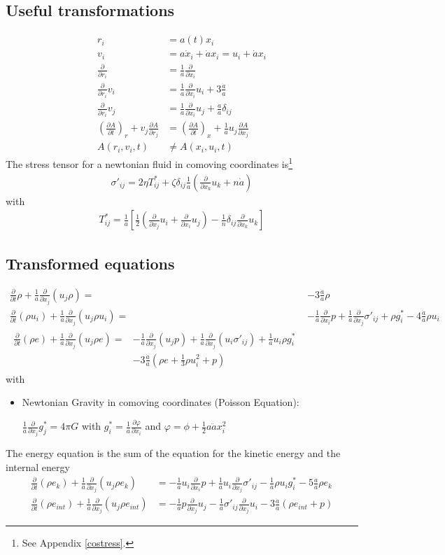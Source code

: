 \documentclass[a4paper,
					fontsize=12pt,
					twoside,
					pagesize,
					cleardoublepage=plain,
					headsepline,
					bibliography=totoc
					]{scrbook}
\newcommand{\lra}[1]{{ \left( #1 \right) }}
\newcommand{\lrb}[1]{{ \left[ #1 \right] }}
\newcommand{\pd}[1]{\frac{\partial}{\partial #1}}
\newcommand{\fa}{\frac{1}{a}}
\newcommand{\fh}{\frac{\dot{a}}{a}}
\begin{document}
\subsection{Useful transformations}
\begin{align}
r_i&=a(t) x_i\\
v_i&= a \dot{x}_i + \dot{a} x_i = u_i + \dot{a} x_i\\
\pd{r_i}&=\fa\pd{x_i}\\
\pd{r_i}v_i&=\fa\pd{x_i}u_i+3\fh\label{eq:cotrans4}\\
\pd{r_i}v_j&=\fa\pd{x_i}u_j + \fh\delta_{ij} \label{eq:cotrans5}\\
\lra{\frac{\partial A}{\partial t}}_r+v_j \frac{\partial A}{\partial r_j} &= 
\lra{\frac{\partial A}{\partial t}}_x+\fa u_j \frac{\partial A}{\partial
x_j}\\
A(r_i,v_i,t) &\neq A(x_i,u_i,t)
\end{align}
The stress tensor for a newtonian fluid in comoving coordinates is\footnote{See
Appendix \ref{costress}.}
\begin{align}
\sigma'_{ij}=2\eta T^*_{ij}+\zeta\delta_{ij}\fa\lra{\pd{x_k}u_k+n\dot{a}}
\end{align}
with 
\begin{align}
T^*_{ij}=\fa\lrb{\frac{1}{2}\lra{\pd{x_j}u_i+\pd{x_i}u_j}
-\frac{1}{n}\delta_{ij}\pd{x_k}u_k}
\end{align}

\subsection{Transformed equations}
\begin{align}
\pd{t}\rho + \fa\pd{x_j}(u_j \rho) =& -3\fh\rho  \\
\pd{t}(\rho u_i) + \fa\pd{x_j}(u_j \rho u_i) =& 
-\fa\pd{x_i}p + \fa\pd{x_j}\sigma'_{ij} +\rho g^*_i -4\fh \rho u_i
\label{eq:commom}
\\
\begin{split}
\pd{t}(\rho e) + \fa\pd{x_j}(u_j \rho e) =& 
-\fa\pd{x_j}(u_j p) + \fa\pd{x_j}(u_i \sigma'_{ij}) + \fa u_i \rho g^*_i \\ 
&- 3 \fh(\rho e +\frac{1}{3}\rho u^2_i+p)\label{eq:cometot}
\end{split}
\end{align}
with
\begin{itemize}
\item Newtonian Gravity in comoving coordinates (Poisson Equation):
 
$\fa\pd{x_j}g^*_j=4\pi G$
with
$g_i^*=\fa\frac{\partial \varphi}{\partial x_i}$ and
$\varphi=\phi+\frac{1}{2}a\ddot{a}x_i^2$
\end{itemize}
The energy equation is the sum of the equation for the kinetic energy and the
internal energy
\begin{align}
\pd{t}(\rho e_k)+\fa\pd{x_j}(u_j \rho e_k) &= -\fa u_i \pd{x_i}p
+\fa u_i \pd{x_j}\sigma'_{ij}-\fa\rho u_i g^*_i-5\fh\rho e_k\\
\pd{t}(\rho e_{int})+\fa\pd{x_j}(u_j \rho e_{int})&=
-\fa p \pd{x_j}u_j -\fa \sigma'_{ij}\pd{x_j}u_i- 3\fh(\rho e_{int} +p)
\end{align}
\end{document}
